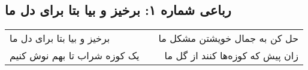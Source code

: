 \begin{center}
\section*{رباعی شماره ۱: برخیز و بیا بتا برای دل ما}
\label{sec:sh001}
\begin{longtable}{l p{0.5cm} r}
برخیز و بیا بتا برای دل ما
&&
حل کن به جمال خویشتن مشکل ما
\\
یک کوزه شراب تا بهم نوش کنیم
&&
زان پیش که کوزه‌ها کنند از گل ما
\\
\end{longtable}
\end{center}
